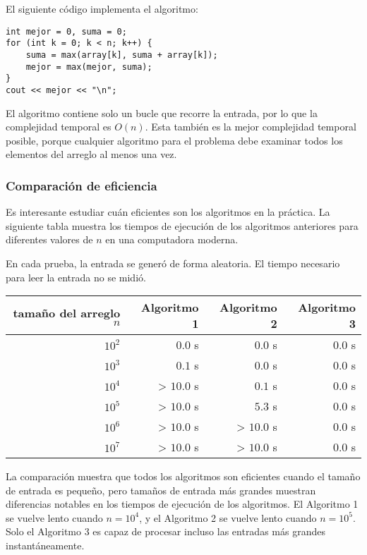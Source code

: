 El siguiente código implementa el algoritmo:
\begin{lstlisting}
int mejor = 0, suma = 0;
for (int k = 0; k < n; k++) {
    suma = max(array[k], suma + array[k]);
    mejor = max(mejor, suma);
}
cout << mejor << "\n";
\end{lstlisting}

El algoritmo contiene solo un bucle
que recorre la entrada,
por lo que la complejidad temporal es $O(n)$.
Esta también es la mejor complejidad temporal posible,
porque cualquier algoritmo para el problema
debe examinar todos los elementos del arreglo al menos una vez.

\subsubsection{Comparación de eficiencia}

Es interesante estudiar cuán eficientes son
los algoritmos en la práctica.
La siguiente tabla muestra los tiempos de ejecución
de los algoritmos anteriores para diferentes
valores de $n$ en una computadora moderna.

En cada prueba, la entrada se generó de forma aleatoria.
El tiempo necesario para leer la entrada no se midió.

\begin{center}
\begin{tabular}{rrrr}
tamaño del arreglo $n$ & Algoritmo 1 & Algoritmo 2 & Algoritmo 3 \\
\hline
$10^2$ & $0.0$ s & $0.0$ s & $0.0$ s \\
$10^3$ & $0.1$ s & $0.0$ s & $0.0$ s \\
$10^4$ & > $10.0$ s & $0.1$ s & $0.0$ s \\
$10^5$ & > $10.0$ s & $5.3$ s & $0.0$ s \\
$10^6$ & > $10.0$ s & > $10.0$ s & $0.0$ s \\
$10^7$ & > $10.0$ s & > $10.0$ s & $0.0$ s \\
\end{tabular}
\end{center}

La comparación muestra que todos los algoritmos
son eficientes cuando el tamaño de entrada es pequeño,
pero tamaños de entrada más grandes muestran diferencias
notables en los tiempos de ejecución de los algoritmos.
El Algoritmo 1 se vuelve lento
cuando $n=10^4$, y el Algoritmo 2
se vuelve lento cuando $n=10^5$.
Solo el Algoritmo 3 es capaz de procesar
incluso las entradas más grandes instantáneamente.